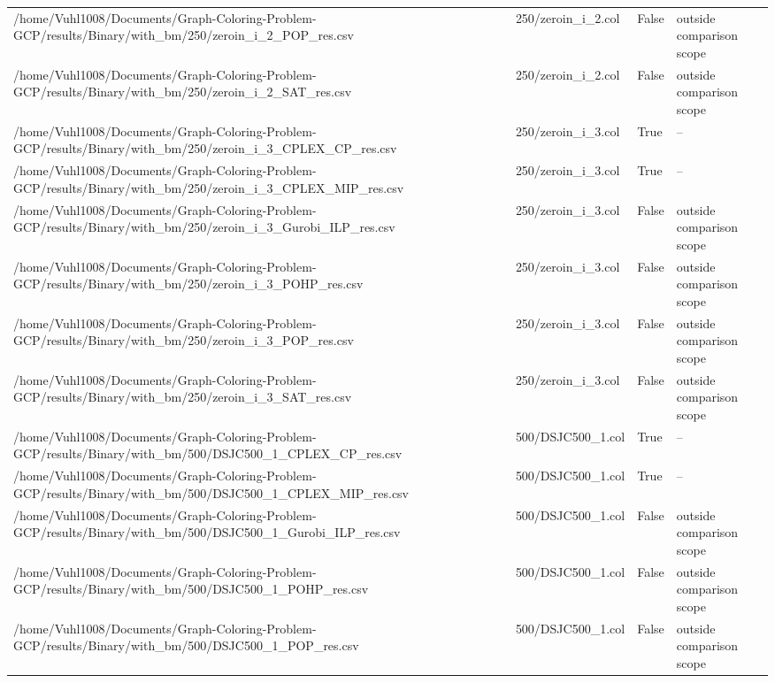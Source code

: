 \begin{table}[htbp]
\begin{tabular}{llll}
/home/Vuhl1008/Documents/Graph-Coloring-Problem-GCP/results/Binary/with\_bm/250/zeroin\_i\_2\_POP\_res.csv & 250/zeroin\_i\_2.col & False & outside comparison scope \\
/home/Vuhl1008/Documents/Graph-Coloring-Problem-GCP/results/Binary/with\_bm/250/zeroin\_i\_2\_SAT\_res.csv & 250/zeroin\_i\_2.col & False & outside comparison scope \\
/home/Vuhl1008/Documents/Graph-Coloring-Problem-GCP/results/Binary/with\_bm/250/zeroin\_i\_3\_CPLEX\_CP\_res.csv & 250/zeroin\_i\_3.col & True & -- \\
/home/Vuhl1008/Documents/Graph-Coloring-Problem-GCP/results/Binary/with\_bm/250/zeroin\_i\_3\_CPLEX\_MIP\_res.csv & 250/zeroin\_i\_3.col & True & -- \\
/home/Vuhl1008/Documents/Graph-Coloring-Problem-GCP/results/Binary/with\_bm/250/zeroin\_i\_3\_Gurobi\_ILP\_res.csv & 250/zeroin\_i\_3.col & False & outside comparison scope \\
/home/Vuhl1008/Documents/Graph-Coloring-Problem-GCP/results/Binary/with\_bm/250/zeroin\_i\_3\_POHP\_res.csv & 250/zeroin\_i\_3.col & False & outside comparison scope \\
/home/Vuhl1008/Documents/Graph-Coloring-Problem-GCP/results/Binary/with\_bm/250/zeroin\_i\_3\_POP\_res.csv & 250/zeroin\_i\_3.col & False & outside comparison scope \\
/home/Vuhl1008/Documents/Graph-Coloring-Problem-GCP/results/Binary/with\_bm/250/zeroin\_i\_3\_SAT\_res.csv & 250/zeroin\_i\_3.col & False & outside comparison scope \\
/home/Vuhl1008/Documents/Graph-Coloring-Problem-GCP/results/Binary/with\_bm/500/DSJC500\_1\_CPLEX\_CP\_res.csv & 500/DSJC500\_1.col & True & -- \\
/home/Vuhl1008/Documents/Graph-Coloring-Problem-GCP/results/Binary/with\_bm/500/DSJC500\_1\_CPLEX\_MIP\_res.csv & 500/DSJC500\_1.col & True & -- \\
/home/Vuhl1008/Documents/Graph-Coloring-Problem-GCP/results/Binary/with\_bm/500/DSJC500\_1\_Gurobi\_ILP\_res.csv & 500/DSJC500\_1.col & False & outside comparison scope \\
/home/Vuhl1008/Documents/Graph-Coloring-Problem-GCP/results/Binary/with\_bm/500/DSJC500\_1\_POHP\_res.csv & 500/DSJC500\_1.col & False & outside comparison scope \\
/home/Vuhl1008/Documents/Graph-Coloring-Problem-GCP/results/Binary/with\_bm/500/DSJC500\_1\_POP\_res.csv & 500/DSJC500\_1.col & False & outside comparison scope \\

\end{tabular}
\end{table}
